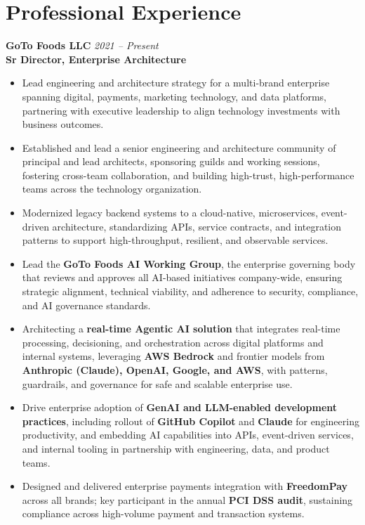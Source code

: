 \documentclass[11pt]{article}
\begin{document}
\section*{Professional Experience}

\textbf{GoTo Foods LLC} \hfill \textit{2021 -- Present} \\
\textbf{Sr Director, Enterprise Architecture}

\begin{itemize}
  \item Lead engineering and architecture strategy for a multi-brand enterprise spanning digital, payments, marketing technology, and data platforms, partnering with executive leadership to align technology investments with business outcomes.
  \item Established and lead a senior engineering and architecture community of principal and lead architects, sponsoring guilds and working sessions, fostering cross-team collaboration, and building high-trust, high-performance teams across the technology organization.
  \item Modernized legacy backend systems to a cloud-native, microservices, event-driven architecture, standardizing APIs, service contracts, and integration patterns to support high-throughput, resilient, and observable services.
  \item Lead the \textbf{GoTo Foods AI Working Group}, the enterprise governing body that reviews and approves all AI-based initiatives company-wide, ensuring strategic alignment, technical viability, and adherence to security, compliance, and AI governance standards.
  \item Architecting a \textbf{real-time Agentic AI solution} that integrates real-time processing, decisioning, and orchestration across digital platforms and internal systems, leveraging \textbf{AWS Bedrock} and frontier models from \textbf{Anthropic (Claude), OpenAI, Google, and AWS}, with patterns, guardrails, and governance for safe and scalable enterprise use.
  \item Drive enterprise adoption of \textbf{GenAI and LLM-enabled development practices}, including rollout of \textbf{GitHub Copilot} and \textbf{Claude} for engineering productivity, and embedding AI capabilities into APIs, event-driven services, and internal tooling in partnership with engineering, data, and product teams.
  \item Designed and delivered enterprise payments integration with \textbf{FreedomPay} across all brands; key participant in the annual \textbf{PCI DSS audit}, sustaining compliance across high-volume payment and transaction systems.

\end{itemize}
\end{document}
